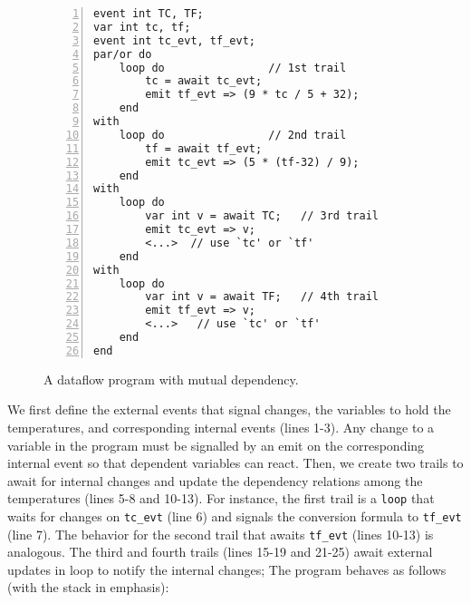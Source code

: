 \documentclass{acm_proc_article-sp}
\newcommand{\code}[1] {{\small{\texttt{#1}}}}
\newcommand{\1}{\;}
\newcommand{\2}{\;\;}
\newcommand{\3}{\;\;\;}
\newcommand{\5}{\;\;\;\;\;}
\begin{document}
\begin{figure}[t]
\begin{lstlisting}[numbers=left,xleftmargin=2em]
event int TC, TF;
var int tc, tf;
event int tc_evt, tf_evt;
par/or do
    loop do                // 1st trail
        tc = await tc_evt;
        emit tf_evt => (9 * tc / 5 + 32);
    end
with
    loop do                // 2nd trail
        tf = await tf_evt;
        emit tc_evt => (5 * (tf-32) / 9);
    end
with
    loop do
        var int v = await TC;   // 3rd trail
        emit tc_evt => v;
        <...>  // use `tc' or `tf'
    end
with
    loop do
        var int v = await TF;   // 4th trail
        emit tf_evt => v;
        <...>   // use `tc' or `tf'
    end
end
\end{lstlisting}
\caption{ A dataflow program with mutual dependency.
\label{lst.frp2}
}
\end{figure}

We first define the external events that signal changes, the variables to hold 
the temperatures, and corresponding internal events (lines 1-3).
Any change to a variable in the program must be signalled by an emit on the 
corresponding internal event so that dependent variables can react.
Then, we create two trails to await for internal changes and update the 
dependency relations among the temperatures (lines 5-8 and 10-13).
For instance, the first trail is a \code{loop} that waits for changes on 
\code{tc\_evt} (line 6) and signals the conversion formula to \code{tf\_evt} 
(line 7).
The behavior for the second trail that awaits \code{tf\_evt} (lines 10-13) is 
analogous.
The third and fourth trails (lines 15-19 and 21-25) await external updates in
loop to notify the internal changes;
The program behaves as follows (with the stack in emphasis):
\end{document}
